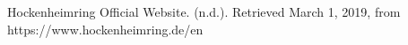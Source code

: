 \documentclass{article}
\begin{document}
\begin{thebibliography}{1}

     Hockenheimring Official Website. (n.d.). Retrieved March 1, 2019, from https://www.hockenheimring.de/en

\end{thebibliography}
















\end{document}
